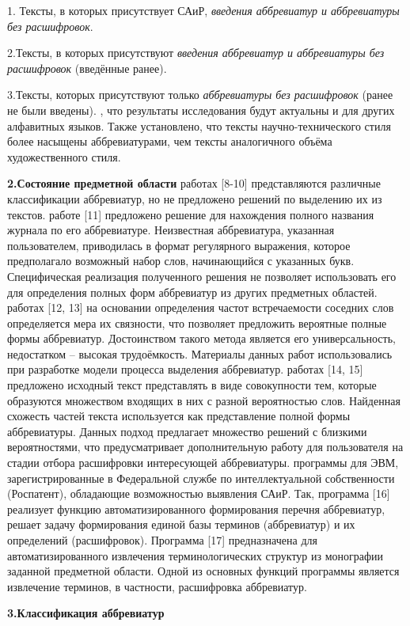 \documentclass[a4paper]{article}
\begin{document}
\par1. Тексты, в которых присутствует САиР, \emph{введения аббревиатур и аббревиатуры без расшифровок}.
\par2.Тексты, в которых присутствуют  \emph{введения аббревиатур и аббревиатуры без расшифровок} (введённые ранее).
\par3.Тексты, которых присутствуют только  \emph{аббревиатуры без расшифровок} (ранее не были введены).
, что результаты исследования будут актуальны и для других алфавитных языков. Также установлено, что тексты научно-технического стиля более насыщены аббревиатурами, чем тексты аналогичного объёма художественного стиля.
\par\textbf{2.Состояние предметной области}
 работах [8-10] представляются различные классификации аббревиатур, но не предложено решений по выделению их из текстов.
 работе [11] предложено решение для нахождения полного названия журнала по его аббревиатуре. Неизвестная аббревиатура, указанная пользователем, приводилась в формат регулярного выражения, которое предполагало возможный набор слов, начинающийся с указанных букв. Специфическая реализация полученного решения не позволяет использовать его для определения полных форм аббревиатур из других предметных областей.
 работах [12, 13] на основании определения частот встречаемости соседних слов определяется мера их связности, что позволяет предложить вероятные полные формы аббревиатур. Достоинством такого метода является его универсальность, недостатком – высокая трудоёмкость. Материалы данных работ использовались при разработке модели процесса выделения аббревиатур.
 работах [14, 15] предложено исходный текст представлять в виде совокупности тем, которые образуются множеством входящих в них с разной вероятностью слов. Найденная схожесть частей текста используется как представление полной формы аббревиатуры. Данных подход предлагает множество решений с близкими вероятностями, что предусматривает дополнительную работу для пользователя на стадии отбора расшифровки интересующей аббревиатуры.
 программы для ЭВМ, зарегистрированные в Федеральной службе по интеллектуальной собственности (Роспатент), обладающие возможностью выявления САиР. Так, программа [16] реализует функцию автоматизированного формирования перечня аббревиатур, решает задачу формирования единой базы терминов (аббревиатур) и их определений (расшифровок). Программа [17] предназначена для автоматизированного извлечения терминологических структур из монографии заданной предметной области. Одной из основных функций программы является извлечение терминов, в частности, расшифровка аббревиатур.
\par\textbf{3.Классификация аббревиатур}
\end{document}
